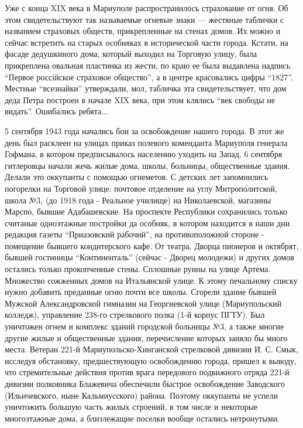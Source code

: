 
Уже с конца XIX века в Мариуполе распространилось страхование от огня. Об этом
свидетельствуют так называемые огневые знаки — жестяные таблички с названием
страховых обществ, прикрепленные на стенах домов. Их можно и сейчас встретить
на старых особняках в исторической части города. Кстати, на фасаде дедушкиного
дома, который выходил на Торговую улицу, была прикреплена овальная пластинка из
жести, по краю ее была выдавлена надпись \enquote{Первое россійское страховое
общество}, а в центре красовались цифры \enquote{1827}. Местные \enquote{всезнайки} утверждали,
мол, табличка эта свидетельствует, что дом деда Петра построен в начале XIX
века, при этом клялись \enquote{век свободы не видать}. Ошибались ребята...


5 сентября 1943 года начались бои за освобождение нашего города. В этот же день
был расклеен на улицах приказ полевого коменданта Мариуполя генерала Гофмана, в
котором предписывалось населению уходить на Запад. 6 сентября гитлеровцы начали
жечь жилые дома, школы, больницы, общественные здания. Делали это оккупанты с
помощью огнеметов. С детских лет запомнились погорелки на Торговой улице:
почтовое отделение на углу Митрополитской, школа №3, (до 1918 года - Реальное
училище) на Николаевской, магазины Марспо, бывшие Адабашевские. На проспекте
Республики сохранились только считаные одноэтажные постройки да  особняк, в
котором находится в наши дни редакция газеты \enquote{Приазовский рабочий}, на
противоположной стороне - помещение бывшего кондитерского кафе. От театра,
Дворца пионеров и октябрят, бывшей гостиницы \enquote{Континенталь} (сейчас - Дворец
молодежи) и других домов остались только прокопченные стены. Сплошные руины на
улице Артема. Множество сожженных домов на Итальянской улице. К этому
печальному списку нужно добавить преданные огню почти все школы.  Сгорели
здание бывшей Мужской Александровской гимназии на Георгиевской улице
(Мариупольский колледж), управление 238-го стрелкового полка (1-й корпус ПГТУ).
Был уничтожен огнем и комплекс зданий городской больницы №3, а также многие
другие жилые и общественные здания, перечисление которых заняло бы много места.
Ветеран 221-й Мариупольско-Хинганской стрелковой дивизии И. С. Смык, исследуя
обстановку, предшествующую освобождению города, пришел к выводу, что
стремительные действия против врага  передо­вого  подвижного отряда 221-й
дивизии полковника Блажевича обеспечили быстрое освобождение Заводского
(Ильичевского, ныне Кальмиусского) района. Поэтому оккупанты не успели
уничтожить большую часть жилых строений, в том числе и некоторые многоэтажные
дома, а  близлежащие  поселки  вообще остались нетронутыми. 


